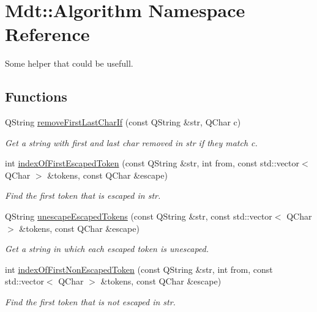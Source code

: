 \hypertarget{namespace_mdt_1_1_algorithm}{}\section{Mdt\+:\+:Algorithm Namespace Reference}
\label{namespace_mdt_1_1_algorithm}


Some helper that could be usefull.  


\subsection*{Functions}
\begin{DoxyCompactItemize}
\item 
Q\+String \hyperlink{namespace_mdt_1_1_algorithm_a0a56e72bba54740c5dc83b59ea1c2d91}{remove\+First\+Last\+Char\+If} (const Q\+String \&str, Q\+Char c)
\begin{DoxyCompactList}\small\item\em Get a string with first and last char removed in str if they match c. \end{DoxyCompactList}\item 
int \hyperlink{namespace_mdt_1_1_algorithm_aadf56549e804ffc292f5b61d4872512b}{index\+Of\+First\+Escaped\+Token} (const Q\+String \&str, int from, const std\+::vector$<$ Q\+Char $>$ \&tokens, const Q\+Char \&escape)
\begin{DoxyCompactList}\small\item\em Find the first token that is escaped in str. \end{DoxyCompactList}\item 
Q\+String \hyperlink{namespace_mdt_1_1_algorithm_a130525973374548a61151ef433a8534c}{unescape\+Escaped\+Tokens} (const Q\+String \&str, const std\+::vector$<$ Q\+Char $>$ \&tokens, const Q\+Char \&escape)
\begin{DoxyCompactList}\small\item\em Get a string in which each escaped token is unescaped. \end{DoxyCompactList}\item 
int \hyperlink{namespace_mdt_1_1_algorithm_a25b3247b25cdf25db6a2641269e37e0d}{index\+Of\+First\+Non\+Escaped\+Token} (const Q\+String \&str, int from, const std\+::vector$<$ Q\+Char $>$ \&tokens, const Q\+Char \&escape)
\begin{DoxyCompactList}\small\item\em Find the first token that is not escaped in str. \end{DoxyCompactList}\item 

\end{DoxyCompactItemize}
